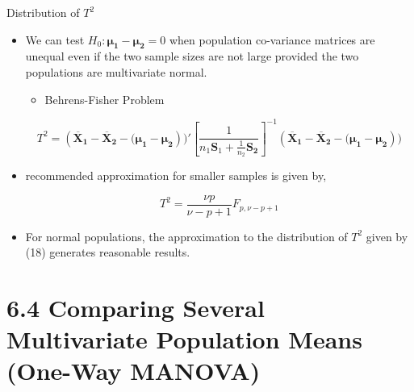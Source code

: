 \documentclass[8pt]{beamer}
\begin{document}
    \begin{frame}{Distribution of $T^{2}$}
    
    
        \begin{itemize}
            \item We can test $H_{0}: \mathbf{\mu_{1} - \mathbf{\mu_{2}}} = 0$ when population co-variance matrices are unequal even if the two sample sizes are not large provided the two populations are multivariate normal. 
            \begin{itemize}
                \item Behrens-Fisher Problem
            \end{itemize}

        
        \begin{equation}
            T^{2} = (\mathbf{\overline{X}_{1} - \overline{X}_{2} - (\mu_{1} - \mu_{2}}))'\left[\frac{1}{n_{1}\mathbf{S}_{1} + \frac{1}{n_{2}}\mathbf{S_{2}}}\right]^{-1}(\mathbf{\overline{X}_{1} - \overline{X}_{2} - (\mu_{1} - \mu_{2}}))
        \end{equation}
        
        \item recommended approximation for smaller samples is given by, 
        
        \begin{equation}
            T^{2} = \frac{\nu p}{\nu - p + 1}F_{p,\nu - p + 1}
        \end{equation}
        
        \item For normal populations, the approximation to the distribution of $T^{2}$ given by (18) generates reasonable results. 
        
        \end{itemize}
    \end{frame}

\section{6.4 Comparing Several Multivariate Population Means (One-Way MANOVA)}
\end{document}
